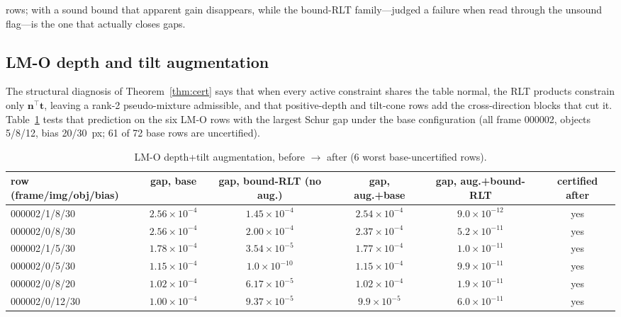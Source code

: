 rows; with a sound bound that apparent gain disappears, while the bound-RLT family---judged a failure when read through the unsound flag---is the one that actually closes gaps.

\subsection{LM-O depth and tilt augmentation}\label{app:lmo}
The structural diagnosis of Theorem~\ref{thm:cert} says that when every active constraint shares the table normal, the RLT products constrain only $\mathbf n^\top\mathbf t$, leaving a rank-2 pseudo-mixture admissible, and that positive-depth and tilt-cone rows add the cross-direction blocks that cut it. Table~\ref{tab:app_lmo} tests that prediction on the six LM-O rows with the largest Schur gap under the base configuration (all frame 000002, objects 5/8/12, bias 20/30~px; 61 of 72 base rows are uncertified).

\begin{table}[t]
\centering
\caption{LM-O depth+tilt augmentation, before $\to$ after (6 worst base-uncertified rows).}
\label{tab:app_lmo}
\scriptsize
\setlength{\tabcolsep}{4pt}
\begin{tabular}{@{}lccccc@{}}
\toprule
row (frame/img/obj/bias) & gap, base & gap, bound-RLT (no aug.) & gap, aug.+base & gap, aug.+bound-RLT & certified after \\
\midrule
000002/1/8/30 & $2.56\times10^{-4}$ & $1.45\times10^{-4}$ & $2.54\times10^{-4}$ & $9.0\times10^{-12}$ & yes \\
000002/0/8/30 & $2.56\times10^{-4}$ & $2.00\times10^{-4}$ & $2.37\times10^{-4}$ & $5.2\times10^{-11}$ & yes \\
000002/1/5/30 & $1.78\times10^{-4}$ & $3.54\times10^{-5}$ & $1.77\times10^{-4}$ & $1.0\times10^{-11}$ & yes \\
000002/0/5/30 & $1.15\times10^{-4}$ & $1.0\times10^{-10}$ & $1.15\times10^{-4}$ & $9.9\times10^{-11}$ & yes \\
000002/0/8/20 & $1.02\times10^{-4}$ & $6.17\times10^{-5}$ & $1.02\times10^{-4}$ & $1.9\times10^{-11}$ & yes \\
000002/0/12/30 & $1.00\times10^{-4}$ & $9.37\times10^{-5}$ & $9.9\times10^{-5}$ & $6.0\times10^{-11}$ & yes \\
\bottomrule
\end{tabular}

\end{table}

